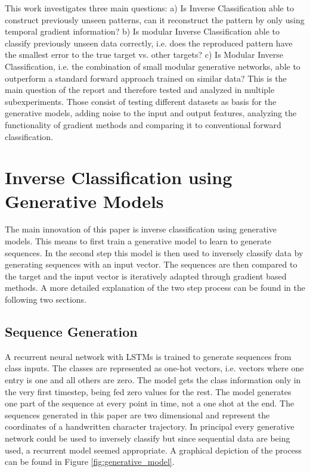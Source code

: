 \documentclass{article}
\begin{document}
This work investigates three main questions: a) Is Inverse Classification able to construct previously unseen patterns, can it reconstruct the pattern by only using temporal gradient information? b) Is modular Inverse Classification able to classify previously unseen data correctly, i.e. does the reproduced pattern have the smallest error to the true target vs. other targets? c) Is Modular Inverse Classification, i.e. the combination of small modular generative networks, able to outperform a standard forward approach trained on similar data? This is the main question of the report and therefore tested and analyzed in multiple subexperiments. Those consist of testing different datasets as basis for the generative models, adding noise to the input and output features, analyzing the functionality of gradient methods and comparing it to conventional forward classification.

\section{Inverse Classification using Generative Models}
\label{sec:ICGM}

The main innovation of this paper is inverse classification using generative models. This means to first train a generative model to learn to generate sequences. In the second step this model is then used to inversely classify data by generating sequences with an input vector. The sequences are then compared to the target and the input vector is iteratively adapted through gradient based methods. A more detailed explanation of the two step process can be found in the following two sections.

\subsection{Sequence Generation}

A recurrent neural network with LSTMs is trained to generate sequences from class inputs. The classes are represented as one-hot vectors, i.e. vectors where one entry is one and all others are zero. The model gets the class information only in the very first timestep, being fed zero values for the rest. The model generates one part of the sequence at every point in time, not a one shot at the end. The sequences generated in this paper are two dimensional and represent the coordinates of a handwritten character trajectory. In principal every generative network could be used to inversely classify but since sequential data are being used, a recurrent model seemed appropriate. A graphical depiction of the process can be found in Figure \ref{fig:generative_model}.
\end{document}

